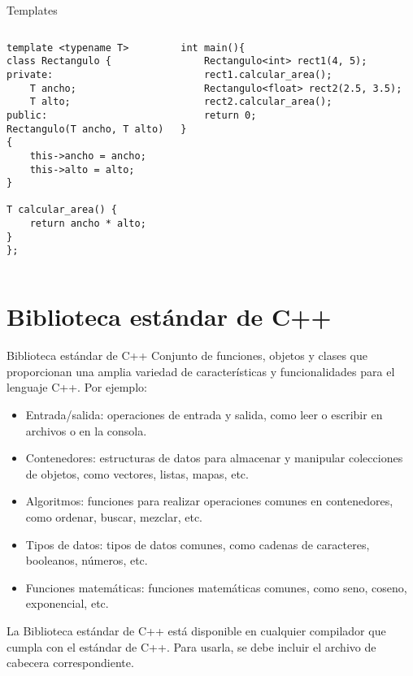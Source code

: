 \documentclass{beamer}
\begin{document}
\begin{frame}[fragile]{Templates}
\begin{columns}
\begin{verbatim}
template <typename T>
class Rectangulo {
private:
    T ancho;
    T alto;
public:
Rectangulo(T ancho, T alto)
{
    this->ancho = ancho;
    this->alto = alto;
}

T calcular_area() {
    return ancho * alto;
}
};
\end{verbatim}

\begin{verbatim}
int main(){
    Rectangulo<int> rect1(4, 5);
    rect1.calcular_area();
    Rectangulo<float> rect2(2.5, 3.5);
    rect2.calcular_area();
    return 0;
}
\end{verbatim}
\end{columns}
\end{frame}


\section{Biblioteca estándar de C++}

\begin{frame}[fragile]{Biblioteca estándar de C++}
Conjunto de funciones, objetos y clases que proporcionan una amplia variedad de características y funcionalidades para el lenguaje C++. Por ejemplo:

\begin{itemize}
\item Entrada/salida: operaciones de entrada y salida, como leer o escribir en archivos o en la consola.
\item Contenedores: estructuras de datos para almacenar y manipular colecciones de objetos, como vectores, listas, mapas, etc.
\item Algoritmos: funciones para realizar operaciones comunes en contenedores, como ordenar, buscar, mezclar, etc.
\item Tipos de datos: tipos de datos comunes, como cadenas de caracteres, booleanos, números, etc.
\item Funciones matemáticas: funciones matemáticas comunes, como seno, coseno, exponencial, etc.
\end{itemize}

La Biblioteca estándar de C++ está disponible en cualquier compilador que cumpla con el estándar de C++. Para usarla, se debe incluir el archivo de cabecera correspondiente.
\end{frame}
\end{document}
